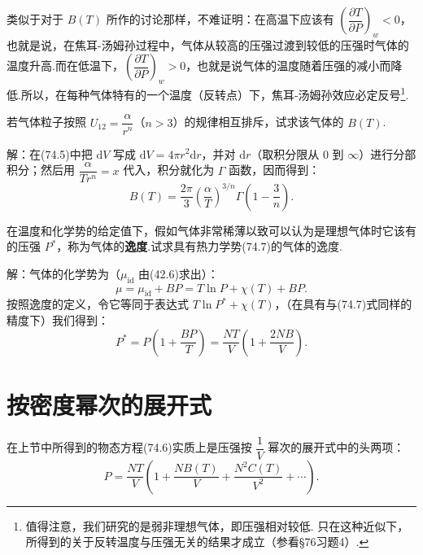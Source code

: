 类似于对于 $B(T)$ 所作的讨论那样，不难证明：在高温下应该有 $\left(\dfrac{\partial T}{\partial P}\right)_w<0$，也就是说，在焦耳-汤姆孙过程中，气体从较高的压强过渡到较低的压强时气体的温度升高.而在低温下，$\left(\dfrac{\partial T}{\partial P}\right)_w>0$，也就是说气体的温度随着压强的减小而降低.所以，在每种气体特有的一个温度（反转点）下，焦耳-汤姆孙效应必定反号\footnote{值得注意，我们研究的是弱非理想气体，即压强相对较低. 只在这种近似下，所得到的关于反转温度与压强无关的结果才成立（参看§76习题4）.}.

\begin{xiti}

\quad 若气体粒子按照 $U_{12}=\dfrac{\alpha}{r^n}$（$n>3$）的规律相互排斥，试求该气体的 $B(T)$.

解：在(74.5)中把 $\mathrm{d}V$ 写成 $\mathrm{d}V=4\pi r^2\mathrm{d}r$，并对 $\mathrm{d}r$（取积分限从 0 到 $\infty$）进行分部积分；然后用 $\dfrac{\alpha}{Tr^n}=x$ 代入，积分就化为 $\Gamma$ 函数，因而得到：
\begin{equation*}
  B(T)=\frac{2\pi}{3}\left(\frac{\alpha}{T}\right)^{3/n}\Gamma\left(1-\frac{3}{n}\right).
\end{equation*}

\quad 在温度和化学势的给定值下，假如气体非常稀薄以致可以认为是理想气体时它该有的压强 $P^{*}$，称为气体的\textbf{逸度}.试求具有热力学势(74.7)的气体的逸度.

解：气体的化学势为（$\mu_{\mathrm{id}}$ 由(42.6)求出）：
\begin{equation*}
  \mu=\mu_{\mathrm{id}}+BP=T\ln P+\chi(T)+BP.
\end{equation*}
按照逸度的定义，令它等同于表达式 $T\ln P^{*}+\chi(T)$，（在具有与(74.7)式同样的精度下）我们得到：
\begin{equation*}
  P^{*}=P\left(1+\frac{BP}{T}\right)=\frac{NT}{V}\left(1+\frac{2NB}{V}\right).
\end{equation*}

\end{xiti}

\section{按密度幂次的展开式}

在上节中所得到的物态方程(74.6)实质上是压强按 $\dfrac{1}{V}$ 幂次的展开式中的头两项：
\begin{equation}
  P=\frac{NT}{V}\left(1+\frac{NB(T)}{V}+\frac{N^2C(T)}{V^2}+\cdots\right).
\end{equation}

